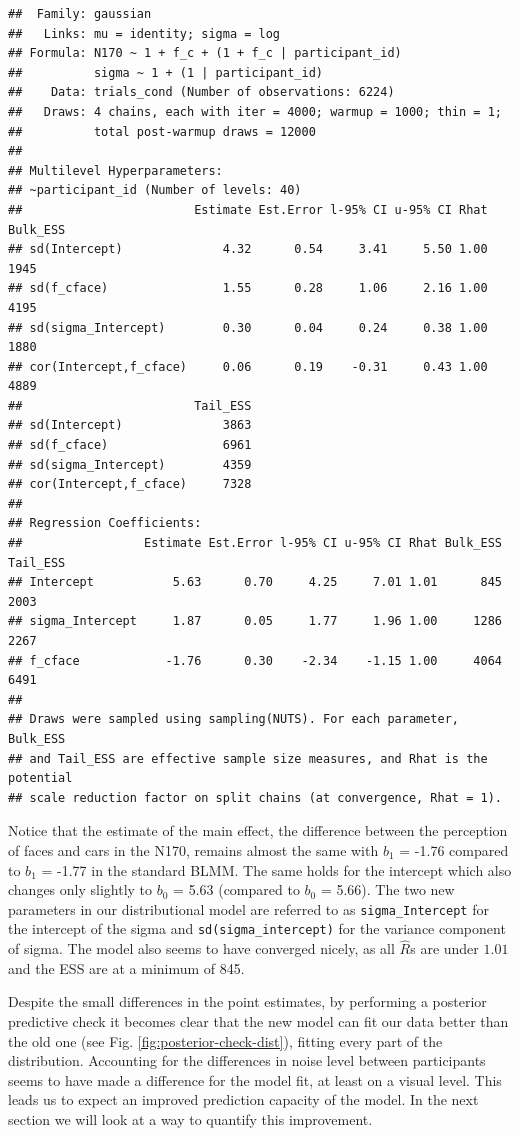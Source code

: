 \documentclass[
  doc,12pt,floatsintext]{apa7}
\begin{document}
\begin{verbatim}
##  Family: gaussian 
##   Links: mu = identity; sigma = log 
## Formula: N170 ~ 1 + f_c + (1 + f_c | participant_id) 
##          sigma ~ 1 + (1 | participant_id)
##    Data: trials_cond (Number of observations: 6224) 
##   Draws: 4 chains, each with iter = 4000; warmup = 1000; thin = 1;
##          total post-warmup draws = 12000
## 
## Multilevel Hyperparameters:
## ~participant_id (Number of levels: 40) 
##                        Estimate Est.Error l-95% CI u-95% CI Rhat Bulk_ESS
## sd(Intercept)              4.32      0.54     3.41     5.50 1.00     1945
## sd(f_cface)                1.55      0.28     1.06     2.16 1.00     4195
## sd(sigma_Intercept)        0.30      0.04     0.24     0.38 1.00     1880
## cor(Intercept,f_cface)     0.06      0.19    -0.31     0.43 1.00     4889
##                        Tail_ESS
## sd(Intercept)              3863
## sd(f_cface)                6961
## sd(sigma_Intercept)        4359
## cor(Intercept,f_cface)     7328
## 
## Regression Coefficients:
##                 Estimate Est.Error l-95% CI u-95% CI Rhat Bulk_ESS Tail_ESS
## Intercept           5.63      0.70     4.25     7.01 1.01      845     2003
## sigma_Intercept     1.87      0.05     1.77     1.96 1.00     1286     2267
## f_cface            -1.76      0.30    -2.34    -1.15 1.00     4064     6491
## 
## Draws were sampled using sampling(NUTS). For each parameter, Bulk_ESS
## and Tail_ESS are effective sample size measures, and Rhat is the potential
## scale reduction factor on split chains (at convergence, Rhat = 1).
\end{verbatim}

\normalsize

Notice that the estimate of the main effect, the difference between the perception of faces and cars in the N170, remains almost the same with \(b_1\) = -1.76 compared to \(b_1\) = -1.77 in the standard BLMM. The same holds for the intercept which also changes only slightly to \(b_0\) = 5.63 (compared to \(b_0\) = 5.66). The two new parameters in our distributional model are referred to as \texttt{sigma\_Intercept} for the intercept of the sigma and \texttt{sd(sigma\_intercept)} for the variance component of sigma. The model also seems to have converged nicely, as all \(\hat{R}\)s are under \(1.01\) and the ESS are at a minimum of 845.

Despite the small differences in the point estimates, by performing a posterior predictive check it becomes clear that the new model can fit our data better than the old one (see Fig. \ref{fig:posterior-check-dist}), fitting every part of the distribution. Accounting for the differences in noise level between participants seems to have made a difference for the model fit, at least on a visual level. This leads us to expect an improved prediction capacity of the model. In the next section we will look at a way to quantify this improvement.
\end{document}
